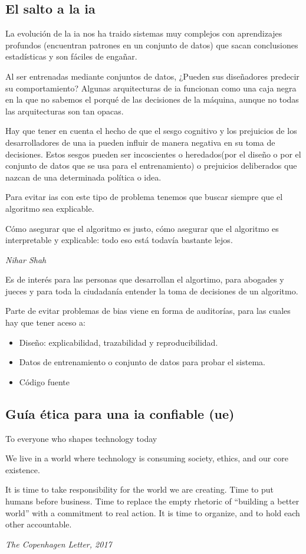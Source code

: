 \subsection{El salto a la \gls{ia}}

La evolución de la \gls{ia} nos ha traido sistemas muy complejos con aprendizajes profundos (encuentran patrones en un conjunto de datos) que sacan conclusiones estadísticas y son fáciles de engañar.

Al ser entrenadas mediante conjuntos de datos, ¿Pueden sus diseñadores predecir su comportamiento?  Algunas arquitecturas de \gls{ia} funcionan como una caja negra en la que no sabemos el porqué de las decisiones de la máquina, aunque no todas las arquitecturas son tan opacas.

Hay que tener en cuenta el hecho de que el sesgo cognitivo y los prejuicios de los desarrolladores de una \gls{ia} pueden influir de manera negativa en su toma de decisiones. 
Estos sesgos pueden ser incoscientes o heredados(por el diseño o por el conjunto de datos que se usa para el entrenamiento) o prejuicios deliberados que nazcan de una determinada política o idea.

Para evitar \gls{ia}s con este tipo de problema tenemos que buscar siempre que el algoritmo sea explicable.

\epigraph{Cómo asegurar que el algoritmo es justo, cómo asegurar que el algoritmo es interpretable y explicable: todo eso está todavía bastante lejos.}{\textit{Nihar Shah}}

Es de interés para las personas que desarrollan el algortimo, para abogades y jueces y para toda la ciudadanía entender la toma de decisiones de un algoritmo.

Parte de evitar problemas de bias viene en forma de auditorías, para las cuales hay que tener aceso a:
\begin{itemize}
    \item Diseño: explicabilidad, trazabilidad y reproducibilidad.
    \item Datos de entrenamiento o conjunto de datos para probar el sistema.
    \item Código fuente
\end{itemize}

\subsection{Guía ética para una \gls{ia} confiable (\gls{ue})}

\epigraph{To everyone who shapes technology today 

We live in a world where technology is consuming society, ethics, and our core existence.

It is time to take responsibility for the world we are creating. Time to put humans before business. Time to replace the empty rhetoric of “building a better world” with a commitment to real action. It is time to organize, and to hold each other accountable.
}{\textit{The Copenhagen Letter, 2017}}

